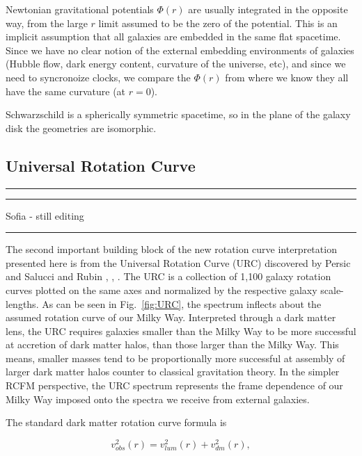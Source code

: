 \documentclass[reprint,%
 amsmath,amssymb,
 aps,
]{revtex4-1}
\begin{document}
 
 
   Newtonian gravitational potentials $\Phi(r)$  are usually integrated in the opposite way, from the large $r$ limit assumed to be the zero of the 
     potential. This is  an implicit assumption that all galaxies are embedded in the same flat spacetime. Since we have no clear notion of the external embedding environments of galaxies (Hubble flow, dark energy content, curvature of the universe, etc), and since we need to syncronoize clocks,  we compare the 
   $\Phi(r)$ from where we know they all have the same curvature (at $r=0$).
   
    
 
Schwarzschild is a spherically symmetric spacetime, so in the plane of the galaxy disk the geometries are isomorphic. 

 \subsection{Universal Rotation Curve }

 {\color{teal} \rule{\linewidth}{0.5mm}}
 
{\color{teal} \rule{\linewidth}{0.5mm}}
 
 {\color{teal}Sofia - still editing}
 {\color{teal} \rule{\linewidth}{0.5mm}}
 
 The second important building block of the new rotation curve interpretation  presented here   is from      the Universal Rotation Curve (URC) discovered by   Persic and Salucci and Rubin \cite{salucci}, \cite{Persic},  \cite{1978Rubin}.  The URC is  a collection of  1,100 galaxy rotation curves   plotted on the same   axes  and normalized by the  respective galaxy scale-lengths.  As can be seen   in Fig.~\ref{fig:URC},    
 the spectrum   inflects about   the assumed rotation curve of our   Milky Way.  Interpreted through a dark matter lens, the URC requires  
   galaxies smaller than the Milky Way to be more successful at accretion of    dark matter halos, than those    larger than the Milky Way.
   This means,  smaller masses tend to be   proportionally more successful at assembly of  larger dark matter halos counter to    classical gravitation theory.    In the simpler RCFM perspective,  the URC spectrum    represents the frame dependence of our Milky Way imposed onto the spectra  we receive  from external galaxies.  
 
  
 The standard dark matter rotation curve formula is

 \begin{equation}
v_{obs}^2 (r)=  v^2_{lum}(r) +  v^2_{dm}(r),  
\label{eq:zonte1}
\end{equation} 
\end{document}
